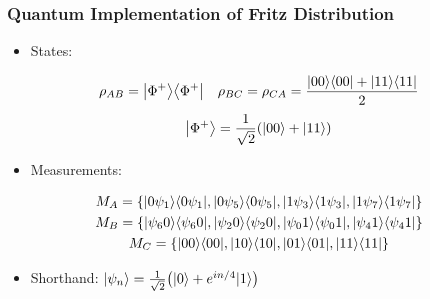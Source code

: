 \documentclass[
    hyperref={bookmarks=false},%
    xcolor={dvipsnames},
]{beamer}
\begin{document}
\begin{frame}
    \frametitle{Quantum Implementation of Fritz Distribution}
    \begin{itemize}
        \item States:
    \end{itemize}
    \begin{gather*}
        \rho_{AB} = \ket{\Phi^+}\bra{\Phi^+} \quad \rho_{BC} = \rho_{CA} = \f{\ket{00}\bra{00} + \ket{11}\bra{11}}{2}
    \end{gather*}
    \[ \ket{\Phi^+} = \f{1}{\sqrt{2}}\br{\ket{00} + \ket{11}} \]
    \begin{itemize}
        \item Measurements:
    \end{itemize}
    \begin{gather*}
        M_{A} = \bc{\ket{0\psi_{1}}\bra{0\psi_{1}}, \ket{0\psi_{5}}\bra{0\psi_{5}}, \ket{1\psi_{3}}\bra{1\psi_{3}}, \ket{1\psi_{7}}\bra{1\psi_{7}}} \\
        M_{B} = \bc{\ket{\psi_{6}0}\bra{\psi_{6}0}, \ket{\psi_{2}0}\bra{\psi_{2}0}, \ket{\psi_{0}1}\bra{\psi_{0}1}, \ket{\psi_{4}1}\bra{\psi_{4}1}} \\
        M_{C} = \bc{\ket{00}\bra{00}, \ket{10}\bra{10}, \ket{01}\bra{01}, \ket{11}\bra{11}}
    \end{gather*}
    \begin{itemize}
        \item Shorthand: $\ket{\psi_n} = \f{1}{\sqrt{2}}\br{\ket{0} + e^{in/4}\ket{1}}$
    \end{itemize}
\end{frame}
\end{document}

